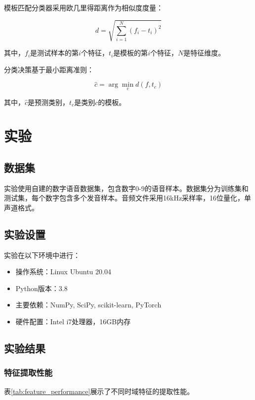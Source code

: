 \documentclass[sigconf,nonacm]{acmart}
\begin{document}
模板匹配分类器采用欧几里得距离作为相似度度量：

\begin{equation}
d = \sqrt{\sum_{i=1}^{N} (f_i - t_i)^2}
\end{equation}

其中，$f_i$是测试样本的第$i$个特征，$t_i$是模板的第$i$个特征，$N$是特征维度。

分类决策基于最小距离准则：

\begin{equation}
\hat{c} = \arg\min_{c} d(f, t_c)
\end{equation}

其中，$\hat{c}$是预测类别，$t_c$是类别$c$的模板。

\section{实验}

\subsection{数据集}

实验使用自建的数字语音数据集，包含数字0-9的语音样本。数据集分为训练集和测试集，每个数字包含多个发音样本。音频文件采用16kHz采样率，16位量化，单声道格式。

\subsection{实验设置}

实验在以下环境中进行：
\begin{itemize}
\item 操作系统：Linux Ubuntu 20.04
\item Python版本：3.8
\item 主要依赖：NumPy, SciPy, scikit-learn, PyTorch
\item 硬件配置：Intel i7处理器，16GB内存
\end{itemize}

\subsection{实验结果}

\subsubsection{特征提取性能}

表\ref{tab:feature_performance}展示了不同时域特征的提取性能。
\end{document}
